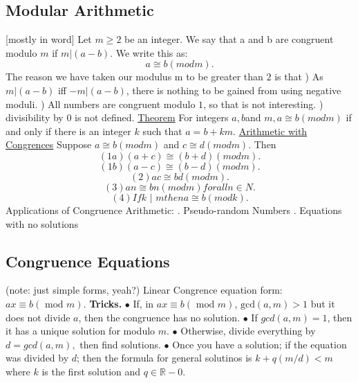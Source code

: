 \documentclass{article}
\begin{document}
\subsection{Modular Arithmetic}
[mostly in word]
\newline
\newline
Let $m \geq 2$ be an integer. We say that a and b are congruent modulo $m$ if $m | (a - b)$.
\newline
We write this as:
$$a \cong b (mod m).$$
The reason we have taken our modulus m to be greater than $2$ is that
)	As $m | (a - b)$ iff $- m | (a - b)$, there is nothing to be gained from using negative moduli.
)	All numbers are congruent modulo $1$, so that is not interesting.
)	divisibility by $0$ is not defined.
\newline
\newline
\underline{Theorem}
\newline
For integers $a, b$and $m, a \cong b (mod m)$ if and only if there is an integer $k$ such that $a = b + km$.
\newline
\newline
\underline{Arithmetic with Congrences}
\newline
Suppose $a \cong b (mod m)$ and $c \cong d (mod m)$.
\newline
Then
$$(1a) (a + c) \cong (b + d) (mod m).$$
$$(1b) (a - c) \cong (b - d) (mod m).$$
$$(2)	ac \cong bd (mod m).$$
$$(3)	an \cong bn (mod m) for all n \in N.$$
$$(4)	If k \text{ | } m then a \cong b (mod k).$$
\newline
\newline
Applications of Congruence Arithmetic:
. Pseudo-random Numbers
. Equations with no solutions
\newpage
\subsection{Congruence Equations}
(note: just simple forms, yeah?)
\newline
\newline
Linear Congrence equation form: $ax \equiv b (\text{ mod }m)$.
\newline
{}
\newline
\newline
\textbf{Tricks. }
\newline
$\bullet $ If, in $ax \equiv b (\text{ mod }m)$, $\text{gcd}(a, m) > 1$ but it does not divide $a$, then the congruence has no solution.
\newline
$\bullet $ If $gcd(a, m) = 1$, then it has a unique solution for modulo $m$.
\newline
$\bullet $ Otherwise, divide everything by $d = gcd(a, m),$ then find solutions.
\newline
$\bullet $ Once you have a solution; if the equation was divided by $d$; then the formula for general solutinos is $k + q (m/d) < m$ where $k$ is the first solution and $q \in \mathbb{R} - {0}$.
\newpage
\end{document}
